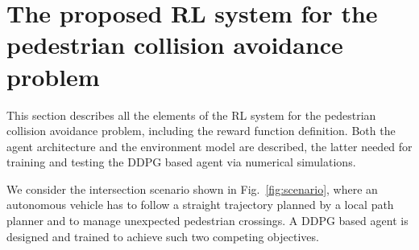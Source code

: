 \section{The proposed RL system for the  pedestrian collision avoidance problem}
\label{sec:Envinronment formalization}
This section describes all the elements of the RL system for the pedestrian collision avoidance problem, including the reward function definition. Both the agent architecture and the environment model are described, the latter needed for training and testing the DDPG based agent via numerical simulations.

We consider the intersection scenario shown in \mbox{Fig.~\ref{fig:scenario}},  where an autonomous vehicle has to follow a straight trajectory planned by a local path planner and to manage unexpected pedestrian crossings. A DDPG based agent is designed and trained to achieve such two competing objectives.  


